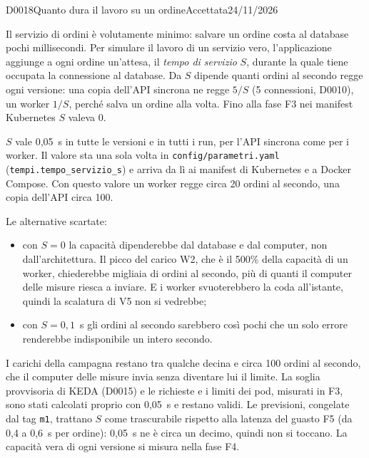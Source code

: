 \begin{decisione}{D0018}{Quanto dura il lavoro su un ordine}{Accettata}{24/11/2026}

\contesto
Il servizio di ordini è volutamente minimo: salvare un ordine costa al database pochi millisecondi. Per simulare il lavoro di un servizio vero, l'applicazione aggiunge a ogni ordine un'attesa, il \emph{tempo di servizio} $S$, durante la quale tiene occupata la connessione al database. Da $S$ dipende quanti ordini al secondo regge ogni versione: una copia dell'API sincrona ne regge $5/S$ (5 connessioni, D0010), un worker $1/S$, perché salva un ordine alla volta. Fino alla fase F3 nei manifest Kubernetes $S$ valeva 0.

\scelta
$S$ vale 0,05~s in tutte le versioni e in tutti i run, per l'API sincrona come per i worker. Il valore sta una sola volta in \texttt{config/parametri.yaml} (\texttt{tempi.tempo\_servizio\_s}) e arriva da lì ai manifest di Kubernetes e a Docker Compose. Con questo valore un worker regge circa 20 ordini al secondo, una copia dell'API circa 100.

Le alternative scartate:
\begin{itemize}
  \item con $S = 0$ la capacità dipenderebbe dal database e dal computer, non dall'architettura. Il picco del carico W2, che è il 500\% della capacità di un worker, chiederebbe migliaia di ordini al secondo, più di quanti il computer delle misure riesca a inviare. E i worker svuoterebbero la coda all'istante, quindi la scalatura di V5 non si vedrebbe;
  \item con $S = 0{,}1$~s gli ordini al secondo sarebbero così pochi che un solo errore renderebbe indisponibile un intero secondo.
\end{itemize}

\conseguenze
I carichi della campagna restano tra qualche decina e circa 100 ordini al secondo, che il computer delle misure invia senza diventare lui il limite. La soglia provvisoria di KEDA (D0015) e le richieste e i limiti dei pod, misurati in F3, sono stati calcolati proprio con 0,05~s e restano validi. Le previsioni, congelate dal tag \texttt{m1}, trattano $S$ come trascurabile rispetto alla latenza del guasto F5 (da 0,4 a 0,6~s per ordine): 0,05~s ne è circa un decimo, quindi non si toccano. La capacità vera di ogni versione si misura nella fase F4.

\end{decisione}

